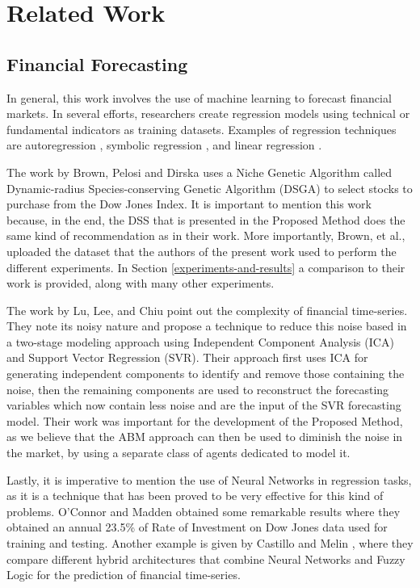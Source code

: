 \documentclass[review]{elsarticle}
\begin{document}
\section{Related Work}
\label{section:related-work}

\subsection{Financial Forecasting}
\label{subsection:financial-forecasting}


In general, this work involves the use of machine learning to forecast
financial markets. In several efforts, researchers create regression
models using technical or fundamental indicators as training
datasets. Examples of regression techniques are autoregression
\cite{burg1968new}, symbolic regression \cite{billard2002symbolic},
and linear regression \cite{kutner2004applied}.

The work by Brown, Pelosi and Dirska \cite{brown2013dynamic} uses a
Niche Genetic Algorithm called Dynamic-radius Species-conserving
Genetic Algorithm (DSGA) to select stocks to purchase from the Dow
Jones Index. It is important to mention this work because, in the end,
the DSS that is presented in the Proposed Method does the same kind of
recommendation as in their work. More importantly, Brown, et al.,
uploaded the dataset that the authors of the present work used to
perform the different experiments. In Section
\ref{experiments-and-results} a comparison to their work is provided,
along with many other experiments.

The work by Lu, Lee, and Chiu \cite{Lu2009} point out the complexity
of financial time-series. They note its noisy nature and propose a
technique to reduce this noise based in a two-stage modeling approach
using Independent Component Analysis (ICA) and Support Vector
Regression (SVR). Their approach first uses ICA for generating
independent components to identify and remove those containing the
noise, then the remaining components are used to reconstruct the
forecasting variables which now contain less noise and are the input
of the SVR forecasting model. Their work was important for the
development of the Proposed Method, as we believe that the ABM
approach can then be used to diminish the noise in the market, by
using a separate class of agents dedicated to model it.

Lastly, it is imperative to mention the use of Neural Networks in
regression tasks, as it is a technique that has been proved to be very
effective for this kind of problems. O'Connor and Madden
\cite{Connor2005} obtained some remarkable results where they obtained
an annual 23.5\% of Rate of Investment on Dow Jones data used for
training and testing. Another example is given by Castillo and Melin
\cite{castillo2001simulation}, where they compare different hybrid
architectures that combine Neural Networks and Fuzzy Logic for the
prediction of financial time-series.
\end{document}
